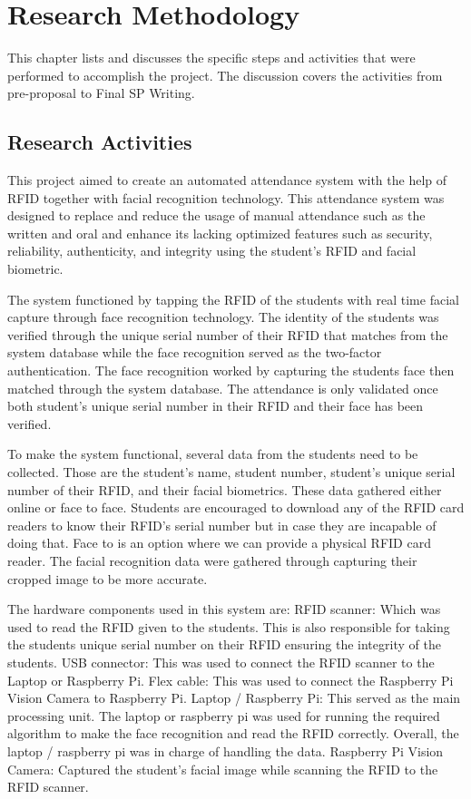 \chapter{Research Methodology}
This chapter lists and discusses the specific steps and activities that were performed  to accomplish the project. 
The discussion covers the activities from pre-proposal to Final SP Writing.

\section{Research Activities}
This project aimed to create an automated attendance system with the help of RFID together with facial recognition technology. This attendance system was designed to replace and reduce the usage of manual attendance such as the written and oral and enhance its lacking optimized features such as security, reliability, authenticity, and integrity using the student’s RFID and facial biometric.

The system functioned by tapping the RFID of the students with real time facial capture through face recognition technology. The identity of the students was verified through the unique serial number of their RFID that matches from the system database while the face recognition served as the two-factor authentication. The face recognition worked by capturing the students face then matched through the system database. The attendance is only validated once both student’s unique serial number in their RFID and their face has been verified.

To make the system functional, several data from the students need to be collected. Those are the student’s name, student number, student’s unique serial number of  their RFID, and their facial biometrics. These data gathered either online or face to face. Students are encouraged to download any of the RFID card readers to know their RFID’s serial number but in case they are incapable of doing that. Face to is an option where we can provide a physical RFID card reader. The facial recognition data were gathered through capturing their cropped image to be more accurate. 

The hardware components used in this system are:
RFID scanner: Which was used to read the RFID given to the students. This is also responsible for taking the students unique serial number on their RFID ensuring the integrity of the students.
USB connector: This was used to connect the RFID scanner to the Laptop or Raspberry Pi. Flex cable: This was used to connect the Raspberry Pi Vision Camera to Raspberry Pi.
Laptop / Raspberry Pi: This served as the main processing unit. The laptop or raspberry pi was used for running the required algorithm to make the face recognition and read the RFID correctly. Overall, the laptop / raspberry pi was in charge of handling the data.
Raspberry Pi Vision Camera: Captured the student’s facial image while scanning the RFID to the RFID scanner. 

